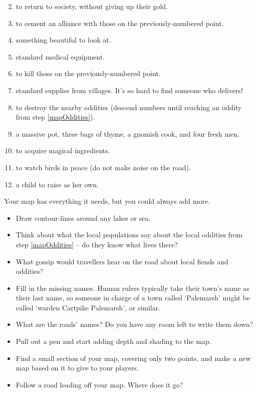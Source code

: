 \begin{multicols}{2}
\begin{enumerate}
\setcounter{enumi}{1}
\item
  to return to society, without giving up their gold.
\item
  to cement an alliance with those on the previously-numbered point.
\item
  something beautiful to look at.
\item
  standard medical equipment.
\item
  to kill those on the previously-numbered point.
\item
  standard supplies from \glspl{village}.
  It's so hard to find someone who delivers!
\item
  to destroy the nearby oddities (descend numbers until reaching an oddity from step \ref{mapOddities}).
\item
  a massive pot, three bags of thyme, a gnomish cook, and four fresh men.
\item
  to acquire magical ingredients.
\item
  to watch birds in peace (do not make noise on the road).
\item
  a child to raise as her own.
\end{enumerate}


Your map has everything it needs, but you could always add more.

\begin{itemize}
  \item
  Draw contour-lines around any lakes or sea.
  \item
  Think about what the local populations say about the local oddities from step \ref{mapOddities} -- do they know what lives there?
  \item
  What gossip would travellers hear on the road about local fiends and oddities?
  \item
  Fill in the missing names.
  Human rulers typically take their town's name as their last name, so someone in charge of a town called `Palemarsh' might be called  `\Gls{warden} Cartpike Palemarsh', or similar.
  \item
  What are the roads' names?
  Do you have any room left to write them down?
  \item
  Pull out a pen and start adding depth and shading to the map.
  \item
  Find a small section of your map, covering only two points, and make a new map based on it to give to your players.
  \item
  Follow a road leading off your map.
  Where does it go?


\end{itemize}
\end{multicols}
